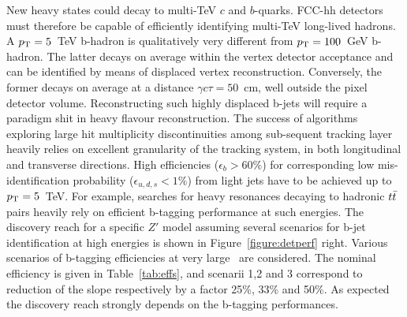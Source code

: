 \documentclass[a4paper,11pt]{article}
\begin{document}
New heavy states could decay to multi-TeV $c$ and $b$-quarks. FCC-hh detectors must therefore be capable of efficiently identifying multi-TeV long-lived hadrons. A $p_{\text{T}}=5$~TeV b-hadron is qualitatively very different from $p_{\text{T}}=100$~GeV b-hadron. The latter decays on average within the vertex detector acceptance and can be identified by means of displaced vertex reconstruction. Conversely, the former decays on average at a distance $\gamma c \tau = 50$~cm, well outside the pixel detector volume. Reconstructing such highly displaced b-jets will require a paradigm shit in heavy flavour reconstruction. The success of algorithms exploring large hit multiplicity discontinuities among sub-sequent tracking layer heavily relies on excellent granularity of the tracking system, in both longitudinal and transverse directions. High efficiencies ($\epsilon_b > 60\%$) for corresponding low mis-identification probability ($\epsilon_{u,d,s} < 1\%$) from light jets have to be achieved up to $p_{\text{T}}=5$~TeV. For example, searches for heavy resonances decaying to hadronic $t\bar{t}$ pairs heavily rely on efficient b-tagging performance at such energies. The discovery reach for a specific $Z'$ model assuming several scenarios for b-jet identification at high energies is shown in Figure~\ref{figure:detperf} right. Various scenarios of b-tagging efficiencies at very large \pt\ are considered. The nominal efficiency is given in Table~\ref{tab:effs}, and scenarii 1,2 and 3 correspond to reduction of the slope respectively by a factor 25\%, 33\% and 50\%. As expected the discovery reach strongly depends on the b-tagging performances.
\end{document}
